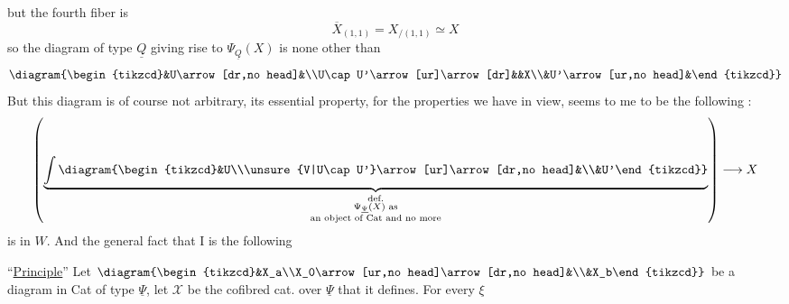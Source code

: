 but the fourth fiber is
\[\overline X_{(1,1)}=X_{/(1,1)}\simeq X\]
so the diagram  of type $\underline Q$ giving rise to $\Psi_{\underline Q}(X)$ is none other than
\[\diagram{\begin{tikzcd}&U\arrow[dr,no head]&\\U\cap U'\arrow[ur]\arrow[dr]&&X\\&U'\arrow[ur,no head]&\end{tikzcd}}\]
But this diagram  is of course not arbitrary, its essential property, for the properties we have in view, seems to me to be the following :
\[\left(\underbrace{\int\diagram{\begin{tikzcd}&U\\\unsure{V|U\cap U'}\arrow[ur]\arrow[dr,no head]&\\&U'\end{tikzcd}}}_{\substack{\text{def.}\\\Psi_{\underline\Psi}(X)\text{ as}\\\text{an object of Cat and no more}}}\right)\longrightarrow X\]
is in $W$. And the general fact that I  is the following

``\uline{Principle}''  Let $\diagram{\begin{tikzcd}&X_a\\X_0\arrow[ur,no head]\arrow[dr,no head]&\\&X_b\end{tikzcd}}$ be a diagram in Cat of type $\underline\Psi$, let $\mathcal X$ be the cofibred cat. over $\underline\Psi$ that it defines. For every $\xi$
